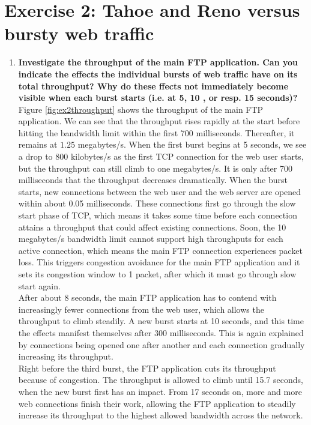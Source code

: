 \section{Exercise 2: Tahoe and Reno versus bursty web traffic}
\begin{enumerate}
 \item \textbf{Investigate the throughput of the main FTP application. Can you indicate the effects the
 individual bursts of web traffic have on its total throughput? Why do these ffects not immediately
 become visible when each burst starts (i.e. at 5, 10 , or resp. 15 seconds)?} \\
 
 Figure \ref{fig:ex2throughput} shows the throughput of the main FTP application. We can see that the throughput rises
 rapidly at the start before hitting the bandwidth limit within the first 700 milliseconds. Thereafter, it remains at $1.25$
 megabytes/s. When the first burst begins at 5 seconds, we see a drop to 800 kilobytes/s as the first TCP connection for the web user
 starts, but the throughput can still climb to one megabytes/s. It is only after 700 milliseconds that the throughput
 decreases dramatically. When the burst starts, new connections between the web user and the web server are opened within
 about 0.05 milliseconds. These connections first go through the slow start phase of TCP, which means it takes some time
 before each connection attains a throughput that could affect existing connections. Soon, the 10 megabytes/s bandwidth
 limit cannot support high throughputs for each active connection, which means the main FTP connection experiences packet loss. This triggers
 congestion avoidance for the main FTP application and it sets its congestion window to 1 packet, after which it
 must go through slow start again. \\
 
 After about 8 seconds, the main FTP application has to contend with increasingly fewer connections from the web user,
 which allows the throughput to climb steadily. A new burst starts at 10 seconds, and this time the effects manifest
 themselves after 300 milliseconds. This is again explained by connections being opened one after another and
 each connection gradually increasing its throughput. \\
 
 Right before the third burst, the FTP application cuts its throughput because of congestion. The throughput is allowed
 to climb until 15.7 seconds, when the new burst first has an impact. From 17 seconds on, more and more web connections
 finish their work, allowing the FTP application to steadily increase its throughput to the highest allowed bandwidth
 across the network.
 

\end{enumerate}
